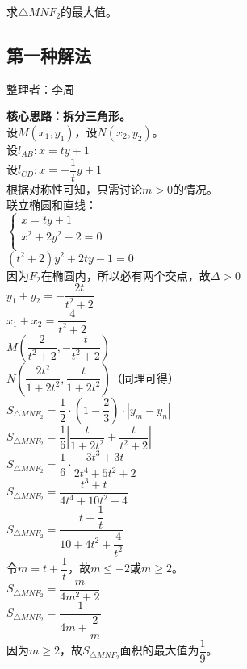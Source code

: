 \documentclass[UTF8]{ctexart}
\begin{document}
    求$\triangle MNF_2$的最大值。

\newpage

\subsection{第一种解法}
    \begin{center}
        整理者：李周
    \end{center}
    \begin{multicols}{2}
        \small
        \textbf{核心思路：拆分三角形。}\\[5mm]
        设$M(x_{1},y_{1})$，设$N(x_{2},y_{2})$。\\[5mm]  
        设$l_{AB}:x=ty+1$\\[5mm]
        设$l_{CD}:x=-\dfrac{1}{t}y+1$\\[5mm]
        根据对称性可知，只需讨论$m>0$的情况。\\[5mm]
        联立椭圆和直线：\\[5mm]
        \begin{math}
            \begin{cases}
                x=ty+1\\[1mm]  
                x^2+2y^2-2=0\\[1mm]
            \end{cases}    
        \end{math}\\[5mm]
        $(t^2+2)y^2+2ty-1=0$\\[5mm]
        因为$F_{2}$在椭圆内，所以必有两个交点，故$\Delta >0$\\[5mm]
        $y_{1}+y_{2}=-\dfrac{2t}{t^2+2}$\\[5mm]
        $x_{1}+x_{2}=\dfrac{4}{t^2+2}$\\[5mm]
        $M(\dfrac{2}{t^2+2},-\dfrac{t}{t^2+2})$\\[5mm]
        $N(\dfrac{2t^2}{1+2t^2},\dfrac{t}{1+2t^2})$（同理可得）\\[8mm]
        $S_{\triangle MNF_{2}}=\dfrac{1}{2}\cdot\left(1-\dfrac{2}{3}\right)\cdot\left|y_{m}-y_{n}\right|$\\[4mm]
        $S_{\triangle MNF_{2}}=\dfrac{1}{6}\left|\dfrac{t}{1+2t^2}+\dfrac{t}{t^2+2}\right|$\\[4mm]
        $S_{\triangle MNF_{2}}=\dfrac{1}{6}\cdot\dfrac{3t^3+3t}{2t^4+5t^2+2}$\\[4mm]
        $S_{\triangle MNF_{2}}=\dfrac{t^3+t}{4t^4+10t^2+4}$\\[4mm]
        $S_{\triangle MNF_{2}}=\dfrac{t+\dfrac{1}{t}}{10+4t^2+\dfrac{4}{t^2}}$\\[20mm]
        令$m=t+\dfrac{1}{t}$，故$m\leq -2$或$m\geq 2$。\\[5mm]
        $S_{\triangle MNF_{2}}=\dfrac{m}{4m^2+2}$\\[5mm]
        $S_{\triangle MNF_{2}}=\dfrac{1}{4m+\dfrac{2}{m}}$\\[2mm]
        因为$m\geq 2$，故$S_{\triangle MNF_{2}}$面积的最大值为$\dfrac{1}{9}$。
        \newpage
    \end{multicols}
\end{document}
